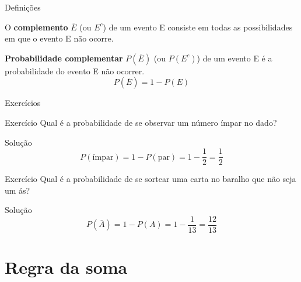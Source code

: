 \documentclass{beamer}
\begin{document}
\begin{frame}{Definições}
  \begin{definition}
    O {\bf complemento} $\bar{E}$ (ou $E^c$) de um evento E consiste
    em todas as possibilidades em que o evento E \alert{não} ocorre.
  \end{definition}
  \begin{definition}
    {\bf Probabilidade complementar} $P(\bar{E})$ (ou $P(E^c)$) de um
    evento E é a probabilidade do evento E \alert{não} ocorrer.
    \begin{displaymath}
      P(\bar{E}) = 1 - P(E)
    \end{displaymath}
  \end{definition}
\end{frame}

\begin{frame}{Exercícios}
  \begin{block}{Exercício}
    Qual é a probabilidade de se observar um número ímpar no dado?
  \end{block}
  \begin{block}{Solução}
    \begin{displaymath}
      P(\text{ímpar}) = 1-P(\text{par}) = 1-\frac{1}{2} = \frac{1}{2}
    \end{displaymath}
  \end{block}
  \begin{block}{Exercício}
    Qual é a probabilidade de se sortear uma carta no baralho que não
    seja um ás?
  \end{block}
  \begin{block}{Solução}
    \begin{displaymath}
      P(\bar{A})   = 1 - P(A) = 1- \frac{1}{13} = \frac{12}{13}
    \end{displaymath}
  \end{block}
\end{frame}

\section{Regra da soma}

\end{document}
